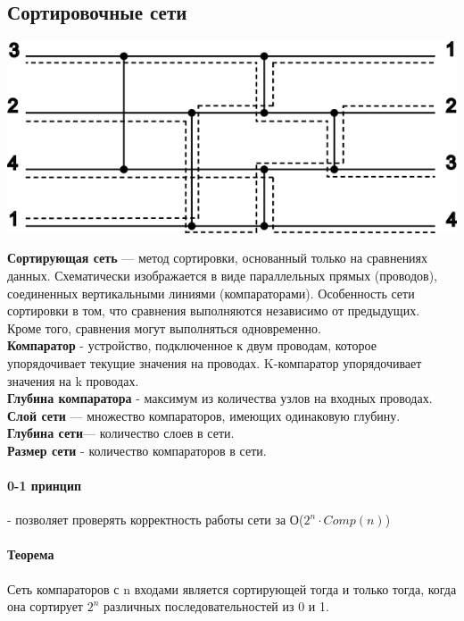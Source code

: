 \documentclass[a4paper,10pt]{article}
\begin{document}
\subsection{Сортировочные сети}
\begin{center}\includegraphics{snet1.png}\end{center}
\textbf{Сортирующая сеть} — метод сортировки, основанный только на сравнениях данных. Схематически изображается в виде параллельных прямых (проводов), соединенных вертикальными линиями (компараторами). Особенность сети сортировки в том, что сравнения выполняются независимо от предыдущих. Кроме того, сравнения могут выполняться одновременно.\\
\textbf{Компаратор} - устройство, подключенное к двум проводам, которое упорядочивает текущие значения на проводах. K-компаратор упорядочивает значения на k проводах.\\
\textbf{Глубина компаратора} - максимум из количества узлов на входных проводах.\\
\textbf{Слой сети} — множество компараторов, имеющих одинаковую глубину.\\
\textbf{Глубина сети}— количество слоев в сети.\\
\textbf{Размер сети} - количество компараторов в сети.\\
\paragraph{0-1 принцип} - позволяет проверять корректность работы сети за О($2^n \cdot Comp(n)$)\\
\paragraph{Теорема} Сеть компараторов с n входами является сортирующей тогда и только тогда, когда она сортирует $2^n$ различных последовательностей из 0 и 1.\\
\end{document}
